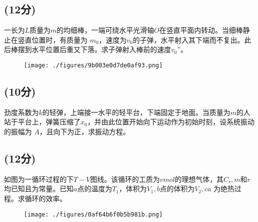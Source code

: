 \subsection{(12分)}
一长为$L$质量为$m$的均细棒，一端可绕水平光滑轴$O$在竖直平面内转动。当细棒静止在竖直位置时，有质量为 $m_0$，速度为$v_0$的子弹，水平射入其下端而不复出。此后棒摆到水平位置后重又下落。求子弹射入棒前的速度$v_0$”。
\begin{figure}[ht]
\centering
\texttt{[image: ./figures/9b003e0d7de0af93.png]}
\caption{} \label{fig_NIU06_4}
\end{figure}
\subsection{(10分)}
劲度系数为$k$的轻弹，上端接一水平的轻平台，下端固定于地面。当质量为$m$的人站于平台上，弹簧压缩了$x_0$，并由此位置开始向下运动作为初始时刻，设系统振动的振幅为 $A$，且向下为正，求振动方程。
\subsection{(12分)}
如图为一循环过程的下$T-V$图线。该循环的工质为$v mol$的理想气体，其$C_r,m$和$r$均已知且为常量。已知$a$点的温度为$T_1$，体积为$V_1,b$点的体积为$V_2,ca$ 为绝热过程。求循环的效率。
\begin{figure}[ht]
\centering
\texttt{[image: ./figures/0af64b6f0b5b981b.png]}
\caption{} \label{fig_NIU06_5}
\end{figure}
